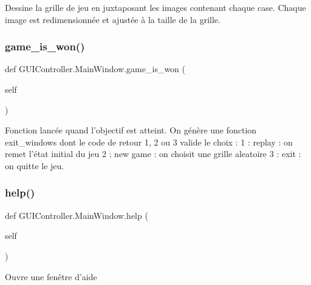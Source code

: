 \begin{DoxyVerb}Dessine la grille de jeu en juxtaposant les images contenant chaque case. Chaque image est redimensionnée et ajustée à la taille de la grille.
\end{DoxyVerb}
 \mbox{\label{classGUIController_1_1MainWindow_af7ba8782708a3a573f5ecd12f7762e81}} 
\subsubsection{\texorpdfstring{game\+\_\+is\+\_\+won()}{game\_is\_won()}}
{\footnotesize\ttfamily def G\+U\+I\+Controller.\+Main\+Window.\+game\+\_\+is\+\_\+won (\begin{DoxyParamCaption}\item[{}]{self }\end{DoxyParamCaption})}

\begin{DoxyVerb}Fonction lancée quand l'objectif est atteint. On génère une fonction exit_windows dont le code de retour 1, 2 ou 3 valide le choix :
1 : replay : on remet l'état initial du jeu
2 : new game : on choisit une grille aleatoire
3 : exit : on quitte le jeu.
\end{DoxyVerb}
 \mbox{\label{classGUIController_1_1MainWindow_a3533d40daad91929865344350ea5ecb2}} 
\subsubsection{\texorpdfstring{help()}{help()}}
{\footnotesize\ttfamily def G\+U\+I\+Controller.\+Main\+Window.\+help (\begin{DoxyParamCaption}\item[{}]{self }\end{DoxyParamCaption})}

\begin{DoxyVerb}Ouvre une fenêtre d'aide\end{DoxyVerb}
 \mbox{\label{classGUIController_1_1MainWindow_a73d640271043cd4917efd0780679b96d}} 
